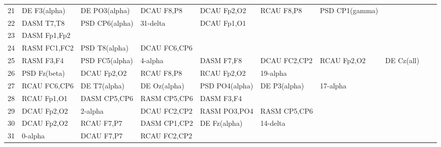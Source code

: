 \begin{landscape}
\begin{table}[]
\begin{tabular}{l|llllllll}
21       & DE F3(alpha)   & DE PO3(alpha)  & DCAU F8,P8     & DCAU Fp2,O2    & RCAU F8,P8     & PSD CP1(gamma) &                &                &               &              \\
22       & DASM T7,T8     & PSD CP6(alpha) & 31-delta       & DCAU Fp1,O1    &                &                &                &                &               &              \\
23       & DASM Fp1,Fp2   &                &                &                &                &                &                &                &               &              \\
24       & RASM FC1,FC2   & PSD T8(alpha)  & DCAU FC6,CP6   &                &                &                &                &                &               &              \\
25       & RASM F3,F4     & PSD FC5(alpha) & 4-alpha        & DASM F7,F8     & DCAU FC2,CP2   & RCAU Fp2,O2    & DE Cz(all)     &                &               &              \\
26       & PSD Fz(beta)   & DCAU Fp2,O2    & RCAU F8,P8     & RCAU Fp2,O2    & 19-alpha       &                &                &                &               &              \\
27       & RCAU FC6,CP6   & DE T7(alpha)   & DE Oz(alpha)   & PSD PO4(alpha) & DE P3(alpha)   & 17-alpha       &                &                &               &              \\
28       & RCAU Fp1,O1    & DASM CP5,CP6   & RASM CP5,CP6   & DASM F3,F4     &                &                &                &                &               &              \\
29       & DCAU Fp2,O2    & 2-alpha        & DCAU FC2,CP2   & RASM PO3,PO4   & RASM CP5,CP6   &                &                &                &               &              \\
30       & DCAU Fp2,O2    & RCAU F7,P7     & DASM CP1,CP2   & DE Fz(alpha)   & 14-delta       &                &                &                &               &              \\
31       & 0-alpha        & DCAU F7,P7     & RCAU FC2,CP2   &                &                &                &                &                &               &              \\
\end{tabular}
\end{table}
\end{landscape}
\clearpage
